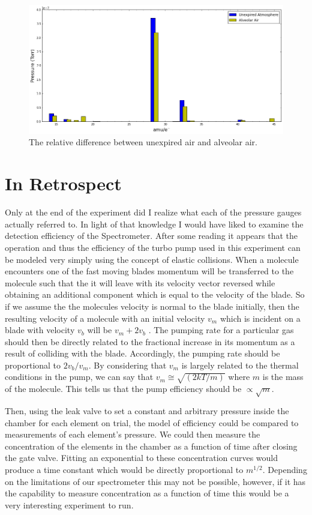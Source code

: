 \documentclass[prb,preprint]{revtex4-1}
\begin{document}
\begin{figure}[h]
	\includegraphics[width=\textwidth]{figures/Atm_Bre.png}
	\caption{The relative difference between unexpired air and alveolar air.}
	\label{asd}
\end{figure}

\newpage

\section{In Retrospect}

Only at the end of the experiment did I realize what each of the pressure gauges actually referred to. In light of that knowledge I would have liked to examine the detection efficiency of the Spectrometer. After some reading it appears that the operation and thus the efficiency of the turbo pump used in this experiment can be modeled very simply using the concept of elastic collisions. When a molecule encounters one of the fast moving blades momentum will be transferred to the molecule such that the it will leave with its velocity vector reversed while obtaining an additional component which is equal to the velocity of the blade. So if we assume the the molecules velocity is normal to the blade initially, then the resulting velocity of a molecule with an initial velocity $v_m$ which is incident on a blade with velocity $v_b$ will be $v_m+2v_b$ . The pumping rate for a particular gas should then be directly related to the fractional increase in its momentum as a result of colliding with the blade. Accordingly, the pumping rate should be proportional to $2v_b/v_m$. By considering that $v_m$ is largely related to the thermal conditions in the pump, we can say that $v_m\cong\sqrt{(2kT/m)}$ where $m$ is the mass of the molecule. This tells us that the pump efficiency should be $\propto \sqrt{m}$.

Then, using the leak valve to set a constant and arbitrary pressure inside the chamber for each element on trial, the model of efficiency could be compared to measurements of each element's pressure. We could then measure the concentration of the elements in the chamber as a function of time after closing the gate valve. Fitting an exponential to these concentration curves would produce a time constant which would be directly proportional to $m^{1/2}$. Depending on the limitations of our spectrometer this may not be possible, however, if it has the capability to measure concentration as a function of time this would be a very interesting experiment to run.
\end{document}
